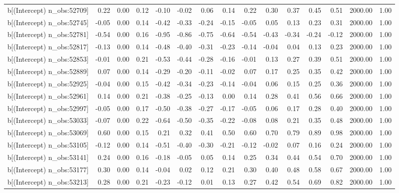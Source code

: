 \begin{table}[ht]
\begin{tabular}{rrrrrrrrrrrrrrr}
  b[(Intercept) n\_obs:52709] & 0.22 & 0.00 & 0.12 & -0.10 & -0.02 & 0.06 & 0.14 & 0.22 & 0.30 & 0.37 & 0.45 & 0.51 & 2000.00 & 1.00 \\ 
  b[(Intercept) n\_obs:52745] & -0.05 & 0.00 & 0.14 & -0.42 & -0.33 & -0.24 & -0.15 & -0.05 & 0.05 & 0.13 & 0.23 & 0.31 & 2000.00 & 1.00 \\ 
  b[(Intercept) n\_obs:52781] & -0.54 & 0.00 & 0.16 & -0.95 & -0.86 & -0.75 & -0.64 & -0.54 & -0.43 & -0.34 & -0.24 & -0.12 & 2000.00 & 1.00 \\ 
  b[(Intercept) n\_obs:52817] & -0.13 & 0.00 & 0.14 & -0.48 & -0.40 & -0.31 & -0.23 & -0.14 & -0.04 & 0.04 & 0.13 & 0.23 & 2000.00 & 1.00 \\ 
  b[(Intercept) n\_obs:52853] & -0.01 & 0.00 & 0.21 & -0.53 & -0.44 & -0.28 & -0.16 & -0.01 & 0.13 & 0.27 & 0.39 & 0.51 & 2000.00 & 1.00 \\ 
  b[(Intercept) n\_obs:52889] & 0.07 & 0.00 & 0.14 & -0.29 & -0.20 & -0.11 & -0.02 & 0.07 & 0.17 & 0.25 & 0.35 & 0.42 & 2000.00 & 1.00 \\ 
  b[(Intercept) n\_obs:52925] & -0.04 & 0.00 & 0.15 & -0.42 & -0.34 & -0.23 & -0.14 & -0.04 & 0.06 & 0.15 & 0.25 & 0.36 & 2000.00 & 1.00 \\ 
  b[(Intercept) n\_obs:52961] & 0.14 & 0.00 & 0.21 & -0.38 & -0.25 & -0.13 & 0.00 & 0.14 & 0.28 & 0.41 & 0.56 & 0.66 & 2000.00 & 1.00 \\ 
  b[(Intercept) n\_obs:52997] & -0.05 & 0.00 & 0.17 & -0.50 & -0.38 & -0.27 & -0.17 & -0.05 & 0.06 & 0.17 & 0.28 & 0.40 & 2000.00 & 1.00 \\ 
  b[(Intercept) n\_obs:53033] & -0.07 & 0.00 & 0.22 & -0.64 & -0.50 & -0.35 & -0.22 & -0.08 & 0.08 & 0.21 & 0.35 & 0.48 & 2000.00 & 1.00 \\ 
  b[(Intercept) n\_obs:53069] & 0.60 & 0.00 & 0.15 & 0.21 & 0.32 & 0.41 & 0.50 & 0.60 & 0.70 & 0.79 & 0.89 & 0.98 & 2000.00 & 1.00 \\ 
  b[(Intercept) n\_obs:53105] & -0.12 & 0.00 & 0.14 & -0.51 & -0.40 & -0.30 & -0.21 & -0.12 & -0.02 & 0.07 & 0.16 & 0.24 & 2000.00 & 1.00 \\ 
  b[(Intercept) n\_obs:53141] & 0.24 & 0.00 & 0.16 & -0.18 & -0.05 & 0.05 & 0.14 & 0.25 & 0.34 & 0.44 & 0.54 & 0.70 & 2000.00 & 1.00 \\ 
  b[(Intercept) n\_obs:53177] & 0.30 & 0.00 & 0.14 & -0.04 & 0.02 & 0.12 & 0.21 & 0.30 & 0.40 & 0.48 & 0.58 & 0.67 & 2000.00 & 1.00 \\ 
  b[(Intercept) n\_obs:53213] & 0.28 & 0.00 & 0.21 & -0.23 & -0.12 & 0.01 & 0.13 & 0.27 & 0.42 & 0.54 & 0.69 & 0.82 & 2000.00 & 1.00 \\ 

\end{tabular}
\end{table}
